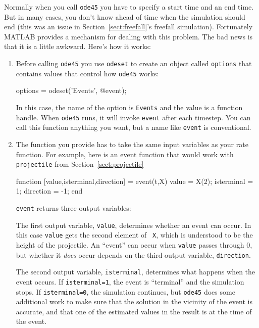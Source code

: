 \documentclass[
]{book}
\numberwithin{Answer}{chapter}
\numberwithin{Exercise}{chapter}
\begin{document}
Normally when you call {\tt ode45} you have to specify a start time and
an end time.  But in many cases, you don't know ahead of time when the
simulation should end (this was an issue in Section~\ref{sect:freefall}'s
freefall simulation). Fortunately MATLAB provides a mechanism for
dealing with this problem.  The bad news is that it is a little awkward.
Here's how it works:

\begin{enumerate}

\item Before calling {\tt ode45} you use {\tt odeset} to create an
object called {\tt options} that contains values that control
how {\tt ode45} works:

\begin{code}
options = odeset('Events', @event);
\end{code}
%
In this case, the name of the option is {\tt Events} and the
value is a function handle.  When {\tt ode45} runs, it will invoke
{\tt event} after each timestep.
You can call this function anything you want, but a name
like {\tt event} is conventional.

\item The function you provide has to take
the same input variables as your rate function.  For example,
here is an event function that would work with {\tt projectile}
from Section~\ref{sect:projectile}

\begin{code}
function [value,isterminal,direction] = event(t,X)
    value = X(2);        %
    isterminal = 1;      %
    direction = -1;      %
end
\end{code}

{\tt event} returns three output variables:

The  first output variable, {\tt value}, determines whether an event can
        occur.  In this case {\tt value} gets the second element of {\tt
        X}, which is understood to be the height of the projectile.  An
        ``event'' can occur when {\tt value} passes through 0, but
        whether it \textit{does} occur depends on the third output
        variable, {\tt direction}.

The second output variable, {\tt isterminal}, determines what happens
        when the event occurs.  If {\tt isterminal=1}, the event is
        ``terminal'' and the simulation stops.  If {\tt isterminal=0},
        the simulation continues, but {\tt ode45} does some additional
        work to make sure that the solution in the vicinity of the event
        is accurate, and that one of the estimated values in the result
        is at the time of the event.


\end{enumerate}
\end{document}
